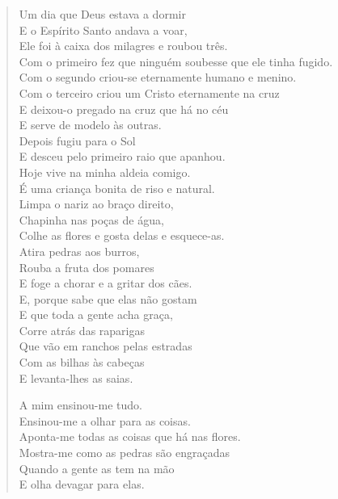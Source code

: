 \begin{verse}
Um dia que Deus estava a dormir \\
E o Espírito Santo andava a voar, \\
Ele foi à caixa dos milagres e roubou três. \\
Com o primeiro fez que ninguém soubesse que ele tinha fugido. \\
Com o segundo criou-se eternamente humano e menino. \\
Com o terceiro criou um Cristo eternamente na cruz \\
E deixou-o pregado na cruz que há no céu \\
E serve de modelo às outras. \\
Depois fugiu para o Sol \\
E desceu pelo primeiro raio que apanhou. \\
Hoje vive na minha aldeia comigo. \\
É uma criança bonita de riso e natural. \\
Limpa o nariz ao braço direito, \\
Chapinha nas poças de água, \\
Colhe as flores e gosta delas e esquece-as. \\
Atira pedras aos burros, \\
Rouba a fruta dos pomares \\
E foge a chorar e a gritar dos cães. \\
E, porque sabe que elas não gostam \\
E que toda a gente acha graça, \\
Corre atrás das raparigas \\
Que vão em ranchos pelas estradas \\
Com as bilhas às cabeças \\
E levanta-lhes as saias.

A mim ensinou-me tudo. \\
Ensinou-me a olhar para as coisas. \\
Aponta-me todas as coisas que há nas flores. \\
Mostra-me como as pedras são engraçadas \\
Quando a gente as tem na mão \\
E olha devagar para elas.


\end{verse}
